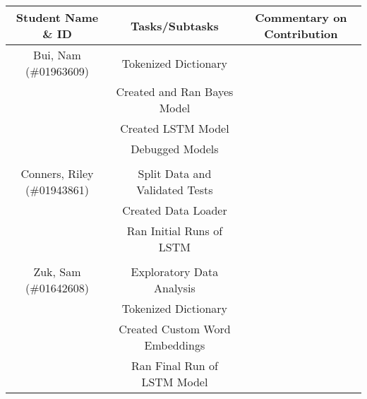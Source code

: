 \documentclass[11pt]{article}
\begin{document}
\begin{table}[H]
    \centering
    \begin{tabular}{c|c|c}
        Student Name \& ID          & Tasks/Subtasks                 & Commentary on Contribution \\
        \hline
        Bui, Nam (\#01963609)       & Tokenized Dictionary           &                            \\
                                    & Created and Ran Bayes Model    &                            \\
                                    & Created LSTM Model             &                            \\
                                    & Debugged Models                &                            \\
                                    &                                &                            \\
        \hline
        Conners, Riley (\#01943861) & Split Data and Validated Tests &                            \\
                                    & Created Data Loader            &                            \\
                                    & Ran Initial Runs of LSTM       &                            \\
                                    &                                &                            \\
        \hline
        Zuk, Sam (\#01642608)       & Exploratory Data Analysis      &                            \\
                                    & Tokenized Dictionary           &                            \\
                                    & Created Custom Word Embeddings &                            \\
                                    & Ran Final Run of LSTM Model    &                            \\
    \end{tabular}
    \label{tab:my_label}
\end{table}



\end{document}
